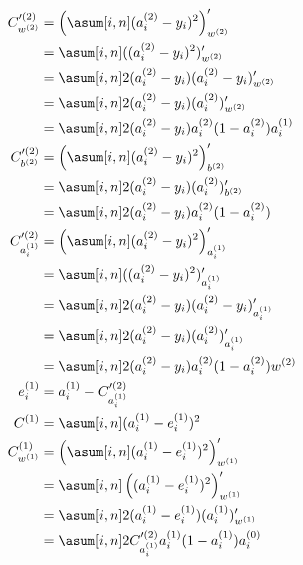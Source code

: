 \documentclass{article}
\begin{document}
\begin{align}
    C'^{(2)}_{w^{(2)}}   & = \left(\asum[i, n] (a_i^{(2)} - y_i)^2\right)'_{w^{(2)}}            \\
                         & = \asum[i, n] ((a_i^{(2)} - y_i)^2)'_{w^{(2)}}                       \\
                         & = \asum[i, n] 2(a_i^{(2)} - y_i)(a_i^{(2)} - y_i)'_{w^{(2)}}         \\
                         & = \asum[i, n] 2(a_i^{(2)} - y_i)(a_i^{(2)})'_{w^{(2)}}               \\
                         & = \asum[i, n] 2(a_i^{(2)} - y_i)a_i^{(2)} (1 - a_i^{(2)}) a_i^{(1)}  \\
    C'^{(2)}_{b^{(2)}}   & = \left(\asum[i, n] (a_i^{(2)} - y_i)^2\right)'_{b^{(2)}}            \\
                         & = \asum[i, n] 2(a_i^{(2)} - y_i)(a_i^{(2)})'_{b^{(2)}}               \\
                         & = \asum[i, n] 2(a_i^{(2)} - y_i)a_i^{(2)} (1 - a_i^{(2)})            \\
    C'^{(2)}_{a_i^{(1)}} & = \left(\asum[i, n] (a_i^{(2)} - y_i)^2\right)'_{a_i^{(1)}}          \\
                         & = \asum[i, n] ((a_i^{(2)} - y_i)^2)'_{a_i^{(1)}}                     \\
                         & = \asum[i, n] 2(a_i^{(2)} - y_i)(a_i^{(2)} - y_i)'_{a_i^{(1)}}       \\
                         & = \asum[i, n] 2(a_i^{(2)} - y_i)(a_i^{(2)})'_{a_i^{(1)}}             \\
                         & = \asum[i, n] 2(a_i^{(2)} - y_i)a_i^{(2)} (1 - a_i^{(2)})w^{(2)}     \\
    e^{(1)}_i            & = a^{(1)}_i - C'^{(2)}_{a_i^{(1)}}                                   \\
    C^{(1)}              & = \asum[i, n] (a^{(1)}_i - e^{(1)}_i)^2                              \\
    C^{(1)}_{w^{(1)}}    & = \left(\asum[i, n] (a^{(1)}_i - e^{(1)}_i)^2\right)'_{w^{(1)}}      \\
                         & = \asum[i, n] \left((a^{(1)}_i - e^{(1)}_i)^2\right)'_{w^{(1)}}      \\
                         & = \asum[i, n] 2(a^{(1)}_i - e^{(1)}_i)(a^{(1)}_i)'_{w^{(1)}}         \\
                         & = \asum[i, n] 2C'^{(2)}_{a_i^{(1)}}a^{(1)}_i(1 - a^{(1)}_i)a_i^{(0)}
\end{align}
\end{document}
